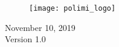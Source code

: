 \documentclass[./main.tex]{subfiles}
\begin{document}
\begin{titlepage}
	
	\vfill\vfill\vfill
	
	\begin{figure}[H]
	\centering
	\texttt{[image: polimi\_logo]}
	\end{figure}
	
	
	\vfill\vfill\vfill
	
	{\large November 10, 2019\\ Version 1.0} %
	
	\vfill
	
\end{titlepage}

\end{document}

